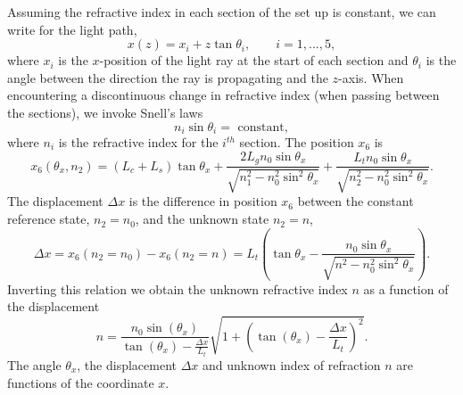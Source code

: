\documentclass[draft]{svjour3}                     %
\begin{document}
Assuming the refractive index in each section of the set up is constant, we can write for the light path,
\begin{equation}
	\label{eq:simpleline}
x(z) = x_i + z \tan \theta_i, \qquad i = 1, ... , 5,
\end{equation}
where $x_i$ is the $x$-position of the light ray at the start of each section and $\theta_i$ is the angle between the direction the ray is propagating and the $z$-axis. When encountering a discontinuous change in refractive index (when passing between the sections), we invoke Snell's laws
\begin{equation}
	\label{eq:snellslaw}
n_i \sin \theta_i = \mbox{ constant},
\end{equation}
where $n_i$ is the refractive index for the $i^{th}$ section. The position $x_6$ is
\begin{equation}
\label{eq:simplex6}
x_6 (\theta_x, n_2) =  (L_c+L_s) \tan \theta_x + \frac{2 L_g n_0 \sin \theta_x}{\sqrt{n_1^2 - n_0^2 \sin^2 \theta_x}} + \frac{L_t n_0 \sin \theta_x}{\sqrt{n_2^2 - n_0^2 \sin^2 \theta_x}}.
\end{equation}
The displacement $\Delta x$ is the difference in position $x_6$ between the constant reference state, $n_2 = n_0$, and the unknown state $n_2=n$, 
\begin{equation}
\label{eq:dexcon2}
\Delta x = x_6 (n_2 = n_0) - x_6 (n_2 = n) = L_t \left( \tan \theta_x - \frac{n_0 \sin \theta_x}{\sqrt{n^2 - n_0^2 \sin^2 \theta_x}} \right) .
\end{equation}
Inverting this relation we obtain the unknown refractive index $n$ as a function of the displacement
\begin{equation}
\label{eq:invdexcon2}
n =\frac{n_0 \sin(\theta_x)}{\tan(\theta_x)-\frac{\Delta x}{L_t}} \sqrt{1+\left(\tan(\theta_x)-\frac{\Delta x}{L_t}\right)^2}. %
\end{equation}
The angle $\theta_x$, the displacement $\Delta x$ and unknown index of refraction $n$ are functions of the coordinate $x$. %
\end{document}
